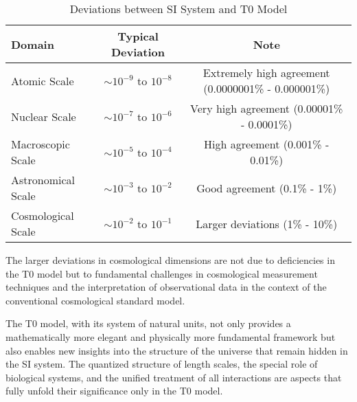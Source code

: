 \documentclass[12pt,a4paper]{article}
\begin{document}
	\begin{table}[H]
		\centering
		\begin{adjustbox}{width=0.95\textwidth}
			\begin{tabular}{lcc}
				\toprule
				\textbf{Domain} & \textbf{Typical Deviation} & \textbf{Note} \\
				\midrule
				Atomic Scale & $\sim10^{-9}$ to $10^{-8}$ & Extremely high agreement (0.0000001\% - 0.000001\%) \\
				Nuclear Scale & $\sim10^{-7}$ to $10^{-6}$ & Very high agreement (0.00001\% - 0.0001\%) \\
				Macroscopic Scale & $\sim10^{-5}$ to $10^{-4}$ & High agreement (0.001\% - 0.01\%) \\
				Astronomical Scale & $\sim10^{-3}$ to $10^{-2}$ & Good agreement (0.1\% - 1\%) \\
				Cosmological Scale & $\sim10^{-2}$ to $10^{-1}$ & Larger deviations (1\% - 10\%) \\
				\bottomrule
			\end{tabular}
		\end{adjustbox}
		\caption{Deviations between SI System and T0 Model}
		\label{tab:deviations}
	\end{table}
	
	The larger deviations in cosmological dimensions are not due to deficiencies in the T0 model but to fundamental challenges in cosmological measurement techniques and the interpretation of observational data in the context of the conventional cosmological standard model.
	
	The T0 model, with its system of natural units, not only provides a mathematically more elegant and physically more fundamental framework but also enables new insights into the structure of the universe that remain hidden in the SI system. The quantized structure of length scales, the special role of biological systems, and the unified treatment of all interactions are aspects that fully unfold their significance only in the T0 model.
	
\end{document}
